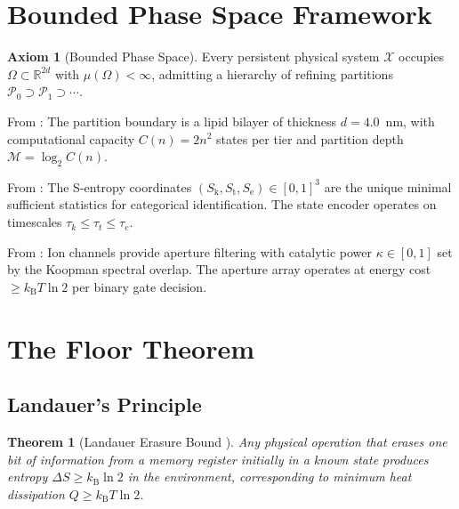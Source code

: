 \documentclass[11pt,twocolumn,a4paper]{article}
\newtheorem{theorem}{Theorem}[section]
\theoremstyle{definition}
\newtheorem{axiom}{Axiom}
\theoremstyle{remark}
\newcommand{\kB}{k_{\mathrm{B}}}
\newcommand{\Sk}{S_{\mathrm{k}}}
\newcommand{\St}{S_{\mathrm{t}}}
\newcommand{\Se}{S_{\mathrm{e}}}
\begin{document}
\section{Bounded Phase Space Framework}
\label{sec:bps}

\begin{axiom}[Bounded Phase Space]
\label{ax:bps}
Every persistent physical system $\mathcal{X}$ occupies $\Omega \subset
\mathbb{R}^{2d}$ with $\mu(\Omega) < \infty$, admitting a hierarchy of
refining partitions $\mathscr{P}_0 \supset \mathscr{P}_1 \supset \cdots$.
\end{axiom}

\noindent From \citep{companion1}: The partition boundary is a lipid bilayer
of thickness $d = 4.0$~nm, with computational capacity $C(n) = 2n^2$ states
per tier and partition depth $\mathcal{M} = \log_2 C(n)$.

\noindent From \citep{companion2}: The S-entropy coordinates
$(\Sk, \St, \Se) \in [0,1]^3$ are the unique minimal sufficient statistics for
categorical identification. The state encoder operates on timescales
$\tau_k \leq \tau_t \leq \tau_e$.

\noindent From \citep{companion3}: Ion channels provide aperture filtering with
catalytic power $\kappa \in [0,1]$ set by the Koopman spectral overlap.
The aperture array operates at energy cost $\geq \kB T \ln 2$ per binary
gate decision.

\section{The Floor Theorem}
\label{sec:floor}

\subsection{Landauer's Principle}

\begin{theorem}[Landauer Erasure Bound \citep{landauer1961}]
\label{thm:landauer}
Any physical operation that erases one bit of information from a memory
register initially in a known state produces entropy $\Delta S \geq \kB \ln 2$
in the environment, corresponding to minimum heat dissipation
$Q \geq \kB T \ln 2$.
\end{theorem}
\end{document}

